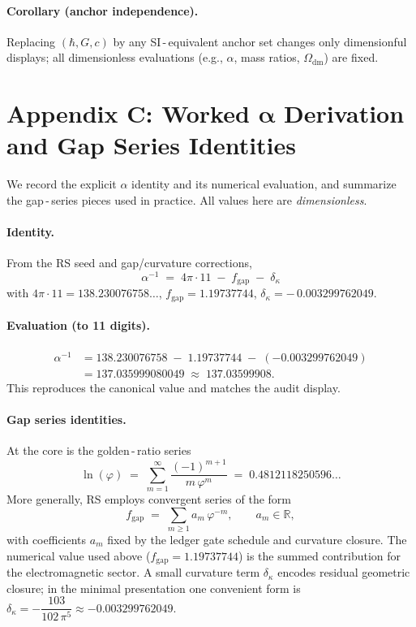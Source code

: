\documentclass[11pt]{article}
\newcommand{\RR}{\mathbb{R}}
\newcommand{\ph}{\varphi}
\theoremstyle{remark}
\begin{document}
\paragraph{Corollary (anchor independence).}
Replacing $(\hbar,G,c)$ by any SI\,\mbox{-}\,equivalent anchor set changes only dimensionful displays;
all dimensionless evaluations (e.g., $\alpha$, mass ratios, $\Omega_{\mathrm{dm}}$) are fixed.

\bigskip
\section*{Appendix C: Worked $\boldsymbol{\alpha}$ Derivation and Gap Series Identities}
We record the explicit $\alpha$ identity and its numerical evaluation, and summarize the
gap\,\mbox{-}\,series pieces used in practice. All values here are \emph{dimensionless}.

\paragraph{Identity.}
From the RS seed and gap/curvature corrections,
\[
  \boxed{\;\alpha^{-1} \;=\; 4\pi\cdot 11\; -\; f_{\mathrm{gap}}\; -\; \delta_{\kappa}\;}
\]
with
$4\pi\cdot 11 = 138.230076758\ldots$,\; $f_{\mathrm{gap}} = 1.19737744$,\; $\delta_{\kappa} = -\,0.003299762049$.

\paragraph{Evaluation (to 11 digits).}
\[
\begin{aligned}
  \alpha^{-1}
  &= 138.230076758\; -\; 1.19737744\; -\; ( -0.003299762049) \\
  &= 137.035999080049\;\approx\; \mathbf{137.03599908}.
\end{aligned}
\]
This reproduces the canonical value and matches the audit display.

\paragraph{Gap series identities.}
At the core is the golden\,\mbox{-}\,ratio series
\[
  \ln(\ph) \;=\; \sum_{m=1}^{\infty} \frac{(-1)^{m+1}}{m\,\ph^{m}} \;=\; 0.4812118250596\ldots
\]
More generally, RS employs convergent series of the form
\[
  f_{\mathrm{gap}} \;=\; \sum_{m\ge 1} a_m\,\ph^{-m},\qquad a_m\in\RR,
\]
with coefficients $a_m$ fixed by the ledger gate schedule and curvature closure. The
numerical value used above ($f_{\mathrm{gap}}=1.19737744$) is the summed contribution for
the electromagnetic sector. A small curvature term $\delta_{\kappa}$ encodes residual
geometric closure; in the minimal presentation one convenient form is
\(
  \delta_{\kappa} = -\dfrac{103}{102\,\pi^{5}} \approx -0.003299762049.
\)
\end{document}
